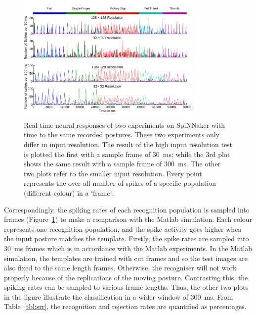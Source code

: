 \begin{figure}
\centering
	\includegraphics[width=0.8\textwidth]{pics/rateSpiNN.pdf}
	\caption{Real-time neural responses of two experiments on SpiNNaker with time to the same recorded postures.
	These two experiments only differ in input resolution.
	The result of the high input resolution test is plotted the first with a sample frame of 30~ms; 
	while the 3rd plot shows the same result with a sample frame of 300~ms.
	The other two plots refer to the smaller input resolution.
	Every point represents the over all number of spikes of a specific population (different colour) in a `frame'.
	}
	\label{fig:spikerec}
\end{figure}

Correspondingly, the spiking rates of each recognition population is sampled into frames (Figure~\ref{fig:spikerec}) to make a comparison with the Matlab simulation. 
Each colour represents one recognition population, and the spike activity goes higher when the input posture matches the template. 
Firstly, the spike rates are sampled into 30~ms frames which is in accordance with the Matlab experiments.
In the Matlab simulation, the templates are trained with cut frames and so the test images are also fixed to the same length frames.
Otherwise, the recogniser will not work properly because of the replications of the moving posture.
Contrasting this, the spiking rates can be sampled to various frame lengths.
Thus, the other two plots in the figure illustrate the classification in a wider window of 300~ms.
From Table~\ref{tbl:srr}, the recognition and rejection rates are quantified as percentages.

